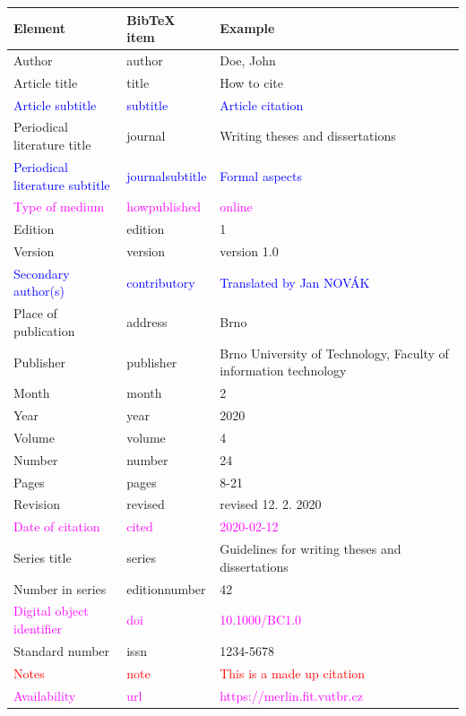 \begin{tabularx}{\linewidth}{X X X}
    Element & BibTeX item & Example\\\hline
    Author & author & Doe, John\\
    Article title & title & How to cite\\
    \textcolor{blue}{Article subtitle} & \textcolor{blue}{subtitle} & \textcolor{blue}{Article citation}\\
    Periodical literature title & journal & Writing theses and dissertations\\
    \textcolor{blue}{Periodical literature subtitle} & \textcolor{blue}{journalsubtitle} & \textcolor{blue}{Formal aspects}\\
    \textcolor{magenta}{Type of medium} & \textcolor{magenta}{howpublished} & \textcolor{magenta}{online}\\
    Edition & edition & 1\\
    Version & version & version 1.0\\
    \textcolor{blue}{Secondary author(s)} & \textcolor{blue}{contributory} & \textcolor{blue}{Translated by Jan NOVÁK}\\
    Place of publication & address & Brno\\
    Publisher & publisher & Brno University of Technology, Faculty of information technology\\
    Month & month & 2\\
    Year & year & 2020\\
    Volume & volume & 4\\
    Number & number & 24\\
    Pages & pages & 8-21\\
    Revision & revised & revised 12. 2. 2020\\
    \textcolor{magenta}{Date of citation} & \textcolor{magenta}{cited} & \textcolor{magenta}{2020-02-12}\\
    Series title & series & Guidelines for writing theses and dissertations\\
    Number in series & editionnumber & 42\\
    \textcolor{magenta}{Digital object identifier} & \textcolor{magenta}{doi} & \textcolor{magenta}{10.1000/BC1.0}\\
    Standard number & issn & 1234-5678\\
    \textcolor{red}{Notes} & \textcolor{red}{note} & \textcolor{red}{This is a made up citation}\\
    \textcolor{magenta}{Availability} & \textcolor{magenta}{url} & \textcolor{magenta}{https://merlin.fit.vutbr.cz}
\end{tabularx}

